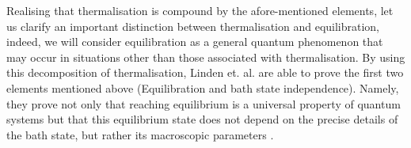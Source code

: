 \indent Realising that thermalisation is compound by the afore-mentioned elements, let us clarify an important distinction between thermalisation and equilibration, indeed, we will consider equilibration as a general quantum phenomenon that may occur in situations other than those associated with thermalisation. By using this decomposition of thermalisation, Linden et. al. are able to prove the first two elements mentioned above (Equilibration and bath state independence). Namely, they prove not only that reaching equilibrium is a universal property of quantum systems but that this equilibrium state does not depend on the precise details of the bath state, but rather its macroscopic parameters \cite{linden_quantum_2009}.\\


